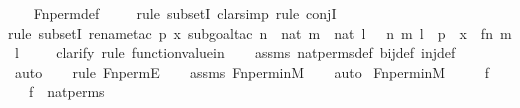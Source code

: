 \begin{isabellebody}
%
\isadelimproof
\ \ %
\endisadelimproof
%
\isatagproof
{}\isamarkupfalse%
\ Fn{\isacharunderscore}{\kern0pt}perm{\isacharprime}{\kern0pt}{\isacharunderscore}{\kern0pt}def\ \isanewline
\ \ \isamarkupfalse%
\ {\isacharparenleft}{\kern0pt}rule\ subsetI{\isacharcomma}{\kern0pt}\ clarsimp{\isacharcomma}{\kern0pt}\ rule\ conjI{\isacharparenright}{\kern0pt}\isanewline
\ \ \ \isamarkupfalse%
{\isacharparenleft}{\kern0pt}rule\ subsetI{\isacharcomma}{\kern0pt}\ rename{\isacharunderscore}{\kern0pt}tac\ p\ x{\isacharcomma}{\kern0pt}\ subgoal{\isacharunderscore}{\kern0pt}tac\ {\isachardoublequoteopen}{\isasymexists}n\ {\isasymin}\ nat{\isachardot}{\kern0pt}\ {\isasymexists}m\ {\isasymin}\ nat{\isachardot}{\kern0pt}\ {\isasymexists}l\ {\isasymin}\ {}{\isachardot}{\kern0pt}\ {\isacharless}{\kern0pt}{\isacharless}{\kern0pt}n{\isacharcomma}{\kern0pt}\ m{\isachargreater}{\kern0pt}{\isacharcomma}{\kern0pt}\ l{\isachargreater}{\kern0pt}\ {\isasymin}\ p\ {\isasymand}\ x\ {\isacharequal}{\kern0pt}\ {\isacharless}{\kern0pt}{\isacharless}{\kern0pt}f{\isacharbackquote}{\kern0pt}n{\isacharcomma}{\kern0pt}\ m{\isachargreater}{\kern0pt}{\isacharcomma}{\kern0pt}\ l{\isachargreater}{\kern0pt}{\isachardoublequoteclose}{\isacharparenright}{\kern0pt}\isanewline
\ \ \ \ \isamarkupfalse%
{\isacharparenleft}{\kern0pt}clarify{\isacharcomma}{\kern0pt}\ rule\ function{\isacharunderscore}{\kern0pt}value{\isacharunderscore}{\kern0pt}in{\isacharparenright}{\kern0pt}\isanewline
\ \ \isamarkupfalse%
\ assms\ nat{\isacharunderscore}{\kern0pt}perms{\isacharunderscore}{\kern0pt}def\ bij{\isacharunderscore}{\kern0pt}def\ inj{\isacharunderscore}{\kern0pt}def\ \isanewline
\ \ \ \ \ \isamarkupfalse%
\ auto{\isacharbrackleft}{\kern0pt}{}{\isacharbrackright}{\kern0pt}\isanewline
\ \ \ \isamarkupfalse%
{\isacharparenleft}{\kern0pt}rule\ Fn{\isacharunderscore}{\kern0pt}permE{\isacharparenright}{\kern0pt}\isanewline
\ \ \isamarkupfalse%
\ assms\ Fn{\isacharunderscore}{\kern0pt}perm{\isacharunderscore}{\kern0pt}in{\isacharunderscore}{\kern0pt}M\isanewline
\ \ \isamarkupfalse%
\ auto%
\endisatagproof
{\isafoldproof}%
%
\isadelimproof
\isanewline
%
\endisadelimproof
\isanewline
{}\isamarkupfalse%
\ Fn{\isacharunderscore}{\kern0pt}perm{\isacharprime}{\kern0pt}{\isacharunderscore}{\kern0pt}in{\isacharunderscore}{\kern0pt}M\ {\isacharcolon}{\kern0pt}\ \isanewline
\ \ \ f\ \isanewline
\ \ \ {\isachardoublequoteopen}f\ {\isasymin}\ nat{\isacharunderscore}{\kern0pt}perms{\isachardoublequoteclose}\ \isanewline

\end{isabellebody}
